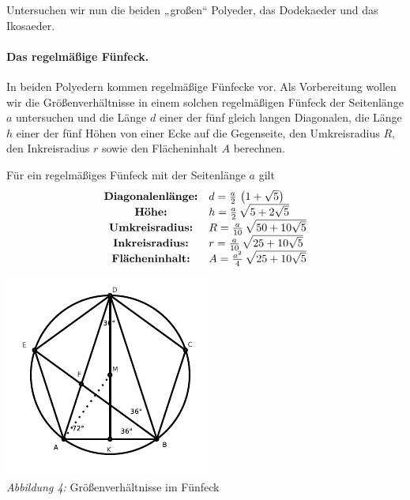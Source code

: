 \documentclass[11pt]{article}
\begin{document}
Untersuchen wir nun die beiden „großen“ Polyeder, das Dodekaeder und das
Ikosaeder. 

\paragraph{Das regelmäßige Fünfeck.}
In beiden Polyedern kommen regelmäßige Fünfecke vor. Als Vorbereitung wollen
wir die Größenverhältnisse in einem solchen regelmäßigen Fünfeck der
Seitenlänge $a$ untersuchen und die Länge $d$ einer der fünf gleich langen
Diagonalen, die Länge $h$ einer der fünf Höhen von einer Ecke auf die
Gegenseite, den Umkreisradius $R$, den Inkreisradius $r$ sowie den
Flächeninhalt $A$ berechnen.

\begin{satz}
  Für ein regelmäßiges Fünfeck mit der Seitenlänge $a$ gilt
  \begin{gather*}
    \begin{array}{cl}    
      \text{\bf Diagonalenlänge:} & d=\frac{a}{2}\,\left(1+\sqrt{5}\right)\\
      \text{\bf Höhe:} & h=\frac{a}{2}\,\sqrt{5+2\sqrt{5}}\\
      \text{\bf Umkreisradius:} & R=\frac{a}{10}\,\sqrt{50+10\sqrt{5}}\\
      \text{\bf Inkreisradius:} & r=\frac{a}{10}\,\sqrt{25+10\sqrt{5}}\\
      \text{\bf Flächeninhalt:} & A=\frac{a^2}{4}\,\sqrt{25+10\sqrt{5}}
    \end{array}
  \end{gather*}
\end{satz}

\begin{center}
  \includegraphics[width=.5\textwidth]{graebe-05-1/Fuenfeck.pdf}\\
  \emph{Abbildung 4:} Größenverhältnisse im Fünfeck
\end{center}
\end{document}
